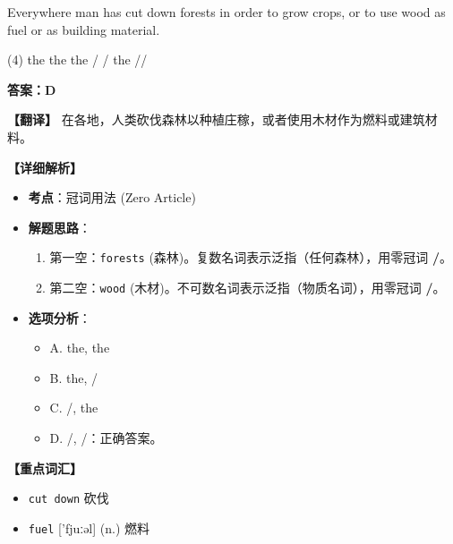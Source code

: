 \documentclass[11pt, a4paper]{article}
\newcommand{\analysis}[4]{
    \begin{solutionbox}
        \textbf{答案：#1}
        
        \textbf{【翻译】} #2
        
        \textbf{【详细解析】}
        #3
        
        \textbf{【重点词汇】}
        #4
    \end{solutionbox}
}
\newcommand{\blank}{\underline{\hspace{1.5cm}}}
\begin{document}
\begin{questions}
    \item Everywhere man has cut down \blank forests in order to grow crops, or to use \blank wood as fuel or as building material.
    \begin{tasks}(4)
        \task the the \task the / \task / the \task //
    \end{tasks}
    \analysis{D}{在各地，人类砍伐森林以种植庄稼，或者使用木材作为燃料或建筑材料。}{
        \begin{itemize}
            \item \textbf{考点}：冠词用法 (Zero Article)
            \item \textbf{解题思路}：
                \begin{enumerate}
                    \item 第一空：\texttt{forests} (森林)。复数名词表示泛指（任何森林），用零冠词 \textbf{/}。
                    \item 第二空：\texttt{wood} (木材)。不可数名词表示泛指（物质名词），用零冠词 \textbf{/}。
                \end{enumerate}
            \item \textbf{选项分析}：
                \begin{itemize}
                    \item A. the, the
                    \item B. the, /
                    \item C. /, the
                    \item D. /, /：正确答案。
                \end{itemize}
        \end{itemize}
    }{
        \begin{itemize}
            \item \texttt{cut down} 砍伐
            \item \texttt{fuel} ['fjuːəl] (n.) 燃料
        \end{itemize}
    }


\end{questions}
\end{document}
